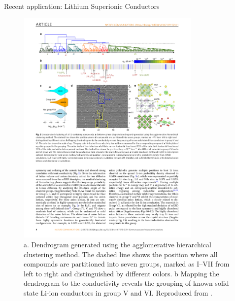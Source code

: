 \documentclass[aspectratio=169]{beamer}
\begin{document}
\begin{frame}{Recent application: Lithium Superionic Conductors}
\begin{figure}
    \centering
    \includegraphics[width=0.8\textwidth]{figures/hirerachicalclustering-superionicconductors.pdf}
    \caption{a. Dendrogram generated using the agglomerative hierarchical clustering method. The dashed line shows the position where all compounds are partitioned into seven groups, marked as I–VII from left to right and distinguished by different colors. b Mapping the dendrogram to the conductivity reveals the grouping of known solid-state Li-ion conductors in group V and VI. Reproduced from \cite{zhangUnsupervisedDiscoverySolidstate2019}.}
\end{figure}
\end{frame}
\end{document}
